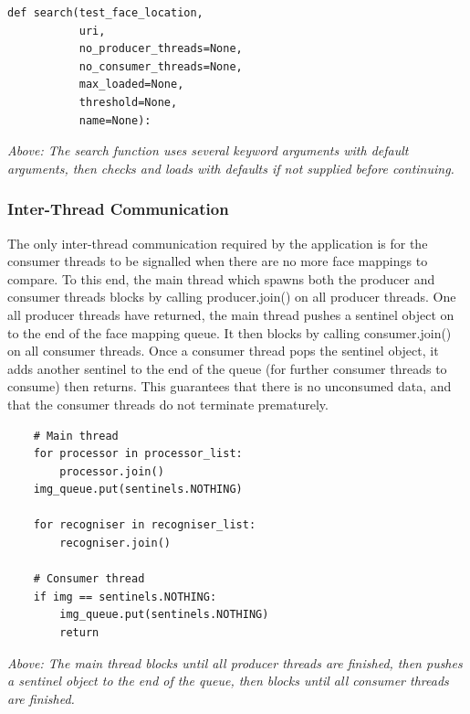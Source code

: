 \documentclass[12pt]{article}
\begin{document}
\begin{lstlisting}
def search(test_face_location,
           uri,
           no_producer_threads=None,
           no_consumer_threads=None,
           max_loaded=None,
           threshold=None,
           name=None):
\end{lstlisting}
\textit{Above: The search function uses several keyword arguments with default arguments, then checks and loads with defaults if not supplied before continuing.}

\subsubsection{Inter-Thread Communication}
The only inter-thread communication required by the application is for the consumer threads to be signalled when there are no more face mappings to compare. To this end, the main thread which spawns both the producer and consumer threads blocks by calling producer.join() on all producer threads. One all producer threads have returned, the main thread pushes a sentinel object on to the end of the face mapping queue. It then blocks by calling consumer.join() on all consumer threads. Once a consumer thread pops the sentinel object, it adds another sentinel to the end of the queue (for further consumer threads to consume) then returns. This guarantees that there is no unconsumed data, and that the consumer threads do not terminate prematurely.

\begin{lstlisting}
	# Main thread
    for processor in processor_list:
        processor.join()
    img_queue.put(sentinels.NOTHING)

    for recogniser in recogniser_list:
        recogniser.join()
        
    # Consumer thread
    if img == sentinels.NOTHING:
        img_queue.put(sentinels.NOTHING)
        return
\end{lstlisting}
\textit{Above: The main thread blocks until all producer threads are finished, then pushes a sentinel object to the end of the queue, then blocks until all consumer threads are finished.}
\end{document}
